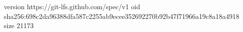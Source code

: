 version https://git-lfs.github.com/spec/v1
oid sha256:698c2da96388dfa587c2255ab9ecee352692270b92b47f71966a19c8a18a4918
size 21173
